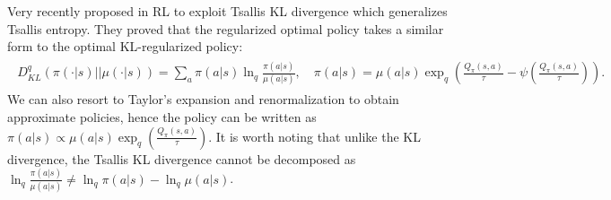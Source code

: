\documentclass{article}
\newcommand{\AdaBracket}[1]{\left(#1\right)}
\newcommand{\qKLany}[2]{D^{q}_{\!K\!L}\!\left(#1 \left|  \right| #2 \right)}
\newcommand{\eq}[1]{Eq.\,(#1)}
\begin{document}
Very recently \citet{zhu2023generalized} proposed in RL to exploit Tsallis KL divergence which generalizes Tsallis entropy.  
They proved that the regularized optimal policy takes a similar form to the optimal KL-regularized policy:
\begin{align}
    \begin{split}
        \qKLany{\pi(\cdot|s)}{\mu(\cdot|s)} = \sum_a \pi(a|s) \ln_{q} \frac{\pi(a|s)}{\mu(a|s)}, \quad \pi(a|s) = \mu(a|s) \exp_q\AdaBracket{\frac{Q_{\pi}(s,a)}{\tau} - \psi\AdaBracket{\frac{Q_{\pi}(s,a)}{\tau}} }.
    \end{split}
    \label{eq:tkl_policy}
\end{align}
We can also resort to Taylor's expansion and renormalization to obtain approximate policies, hence the policy can be written as $\pi(a|s)\propto \mu(a|s)\exp_q\AdaBracket{\frac{Q_{\pi}(s,a)}{\tau}}$.
It is worth noting that unlike the KL divergence, the Tsallis KL divergence cannot be decomposed as $\ln_q\!\frac{\pi(a|s)}{\mu(a|s)} \neq \ln_q \pi(a|s) - \ln_q \mu(a|s)$.
\end{document}
